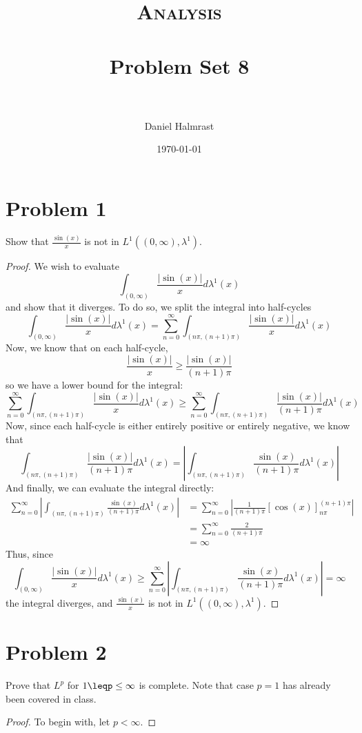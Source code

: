 \documentclass[fontsize=11pt]{scrartcl} %
\title{	
\normalfont \normalsize 
\textsc{Analysis} \\ [25pt] %
\horrule{0.5pt} \\[0.4cm] %
\huge Problem Set 8 \\ %
\horrule{2pt} \\[0.5cm] %
}
\author{Daniel Halmrast} %
\date{\normalsize\today} %
\numberwithin{equation}{section} %
\numberwithin{figure}{section} %
\numberwithin{table}{section} %
\begin{document}
\maketitle %

\section*{Problem 1}
Show that $\frac{\sin(x)}{x}$ is not in $L^1((0,\infty),\lambda^1)$.
\\
\begin{proof}
We wish to evaluate
    \[
        \int_{(0,\infty)}\frac{|\sin(x)|}{x}d\lambda^1(x)
    \]
    and show that it diverges. To do so, we split the integral into half-cycles
    \[
        \int_{(0,\infty)}\frac{|\sin(x)|}{x}d\lambda^1(x) = 
        \sum_{n=0}^{\infty} \int_{(n\pi,(n+1)\pi)}\frac{|\sin(x)|}{x}d\lambda^1(x)
    \]
    Now, we know that on each half-cycle,
    \[
        \frac{|\sin(x)|}{x} \geq \frac{|\sin(x)|}{(n+1)\pi}
    \]
    so we have a lower bound for the integral:
    \[
        \sum_{n=0}^{\infty}
        \int_{(n\pi,(n+1)\pi)}\frac{|\sin(x)|}{x}d\lambda^1(x)\geq
        \sum_{n=0}^{\infty}
        \int_{(n\pi,(n+1)\pi)}\frac{|\sin(x)|}{(n+1)\pi}d\lambda^1(x)
    \]
    Now, since each half-cycle is either entirely positive or entirely negative,
    we know that
    \[
        \int_{(n\pi,(n+1)\pi)}\frac{|\sin(x)|}{(n+1)\pi}d\lambda^1(x)=
        \left|\int_{(n\pi,(n+1)\pi)}\frac{\sin(x)}{(n+1)\pi}d\lambda^1(x)\right|
    \]
    And finally, we can evaluate the integral directly:
    \[
        \begin{aligned}
        \sum_{n=0}^{\infty}
        \left|\int_{(n\pi,(n+1)\pi)}\frac{\sin(x)}{(n+1)\pi}d\lambda^1(x)\right|
            &=
        \sum_{n=0}^{\infty}
            \left|\frac{1}{(n+1)\pi}[\cos(x)]_{n\pi}^{(n+1)\pi}\right|\\
            &=
        \sum_{n=0}^{\infty}
            \frac{2}{(n+1)\pi}\\
            &=\infty
        \end{aligned}
    \]
    Thus, since 
    \[
        \int_{(0,\infty)}\frac{|\sin(x)|}{x}d\lambda^1(x)\geq
        \sum_{n=0}^{\infty}
        \left|\int_{(n\pi,(n+1)\pi)}\frac{\sin(x)}{(n+1)\pi}d\lambda^1(x)\right|
        = \infty
    \]
    the integral diverges, and $\frac{\sin(x)}{x}$ is not in
    $L^1((0,\infty),\lambda^1)$.
\end{proof}

\newpage

\section*{Problem 2}
Prove that $L^p$ for $1\leqp\leq\infty$ is complete. Note that case $p=1$ has
already been covered in class.
\\
\begin{proof}
To begin with, let $p<\infty$. 
\end{proof}
\end{document}
